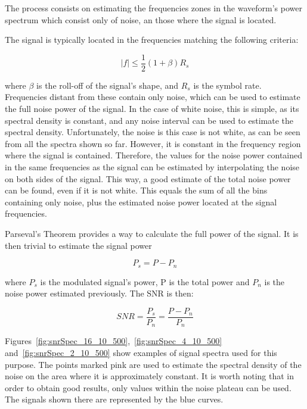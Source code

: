 \begin{refsection}
The process consists on estimating the frequencies zones in the waveform's 
power spectrum which consist only of noise, an those where the signal is 
located.

The signal is typically located in the frequencies matching the following 
criteria:

\begin{equation}
|f| \leq \frac{1}{2} (1+\beta) R_s
\end{equation}

where $\beta$ is the roll-off of the signal's shape, and $R_s$ is the symbol 
rate. Frequencies distant from these contain only noise, which can be used to 
estimate the full noise power of the signal. In the case of white noise, this 
is simple, as its spectral density is constant, and any noise interval can be 
used to estimate the spectral density. Unfortunately, the noise is this case is 
not white, as can be seen from all the spectra shown so far. However, it is 
constant in the frequency region where the signal is 
contained. Therefore, the values for the noise power contained in 
the same frequencies as the signal can be estimated by interpolating the noise 
on both sides of the signal. This way, a good estimate of the total noise power 
can be found, even if it is not white. This equals the sum of all the 
bins containing only noise, plus the estimated noise power located at the 
signal frequencies.

Parseval's Theorem provides a way to calculate the full power of the signal. It 
is then trivial to estimate the signal power

\begin{equation}
P_s = P - P_n
\end{equation}

where $P_s$ is the modulated signal's power, P is the total power and $P_n$ is 
the noise power estimated previously. The SNR is then:

\begin{equation}
SNR = \frac{P_s}{P_n} = \frac{P - P_n}{P_n}
\end{equation}

Figures~\ref{fig:snrSpec_16_10_500},~\ref{fig:snrSpec_4_10_500} 
and~\ref{fig:snrSpec_2_10_500} show examples of signal spectra used for this 
purpose. The points marked pink are 
used to estimate the spectral density of the noise on the area where it is 
approximately constant. It is worth noting that in order to obtain good 
results, only values within the noise plateau can be used. The signals shown 
there are represented by the blue curves.


\end{refsection}
